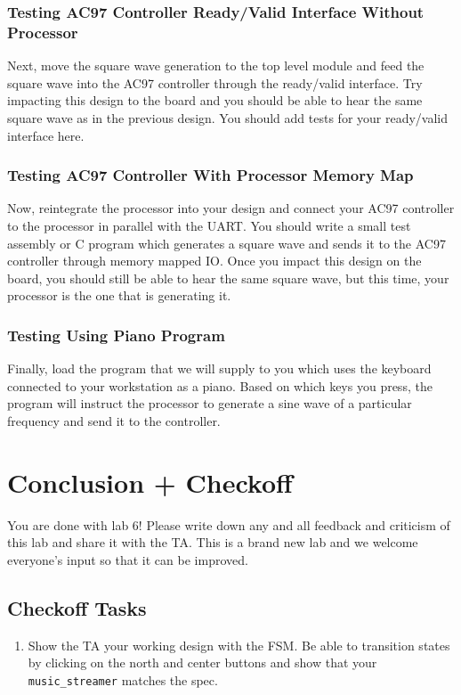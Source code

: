 \documentclass[11pt]{article}
\begin{document}
\subsubsection{Testing AC97 Controller Ready/Valid Interface Without Processor}
Next, move the square wave generation to the top level module and feed the square wave into the AC97 controller through the ready/valid interface. Try impacting this design to the board and you should be able to hear the same square wave as in the previous design. You should add tests for your ready/valid interface here.

\subsubsection{Testing AC97 Controller With Processor Memory Map}
Now, reintegrate the processor into your design and connect your AC97 controller to the processor in parallel with the UART. You should write a small test assembly or C program which generates a square wave and sends it to the AC97 controller through memory mapped IO. Once you impact this design on the board, you should still be able to hear the same square wave, but this time, your processor is the one that is generating it.

\subsubsection{Testing Using Piano Program}
Finally, load the program that we will supply to you which uses the keyboard connected to your workstation as a piano. Based on which keys you press, the program will instruct the processor to generate a sine wave of a particular frequency and send it to the controller.


\section{Conclusion + Checkoff}
You are done with lab 6! Please write down any and all feedback and criticism of this lab and share it with the TA. This is a brand new lab and we welcome everyone's input so that it can be improved.\\

\subsection{Checkoff Tasks}

\begin{enumerate}
	\item Show the TA your working design with the FSM. Be able to transition states by clicking on the north and center buttons and show that your \verb|music_streamer| matches the spec.
\end{enumerate}
\end{document}
